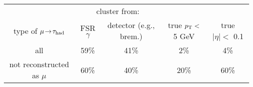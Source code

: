 \begin{tabular}{c|cc|cc}
                             & \multicolumn{2}{c}{cluster from:}     &                     &                      \\
  type of $\mu\!\rightarrow\!\tau_\text{had}$           & FSR $\gamma$ & detector (e.g., brem.) & true $p_{\mathrm{T}} < $ 5 GeV & true $|\eta| < $ 0.1 \\
  \hline
  all                        & 59\%         & 41\%                   & 2\%                 & 4\%                  \\
  not reconstructed as $\mu$ & 60\%         & 40\%                   & 20\%                & 60\%                 \\
\end{tabular}

